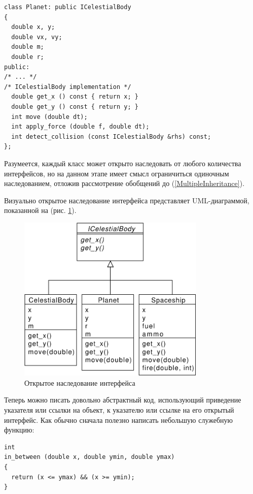 \documentclass[a4paper,12pt,oneside]{article}
\begin{document}
\begin{lstlisting}
class Planet: public ICelestialBody
{
  double x, y;
  double vx, vy;
  double m;
  double r;
public:
/* ... */
/* ICelestialBody implementation */
  double get_x () const { return x; }
  double get_y () const { return y; }
  int move (double dt);
  int apply_force (double f, double dt);
  int detect_collision (const ICelestialBody &rhs) const;
};
\end{lstlisting}

Разумеется, каждый класс может открыто наследовать от любого количества интерфейсов, но на данном этапе имеет смысл ограничиться одиночным наследованием, отложив рассмотрение обобщений до (\ref{MultipleInheritance}).

Визуально открытое наследование интерфейса представляет UML-диаграммой, показанной на (рис. \ref{fig:inheritance-interface}).

\begin{figure}[ht]
\centering
\includegraphics[width=0.8\textwidth]{illustrations/intf-inheritance-crop.pdf}
\caption{Открытое наследование интерфейса}
\label{fig:inheritance-interface}
\end{figure}

Теперь можно писать довольно абстрактный код, использующий приведение указателя или ссылки на объект, к указателю или ссылке на его открытый интерфейс. Как обычно сначала полезно написать небольшую служебную функцию:

\begin{lstlisting}
int 
in_between (double x, double ymin, double ymax)
{
  return (x <= ymax) && (x >= ymin);
}
\end{lstlisting}
\end{document}
